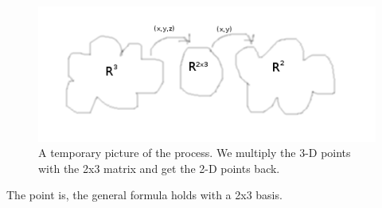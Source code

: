 \documentclass[a4paper]{article}
\begin{document}
\begin{figure}
\includegraphics{mediator.png}
\caption{A temporary picture of the process. We multiply the 3-D points with the 2x3 matrix and get the 2-D points back.}
\end{figure}

The point is, the general formula holds with a 2x3 basis.\\

\\
\end{document}
